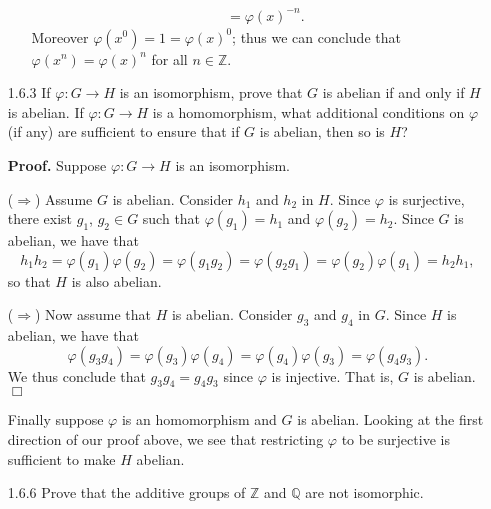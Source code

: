 \documentclass[9pt]{article}
\newcommand{\qed}{\hfill \ensuremath{\Box}}
\newcommand{\Z}{\mathbb{Z}}
\newcommand{\Q}{\mathbb{Q}}
\begin{document}
\begin{enumerate}
\begin{enumerate}
\begin{align*}
                     &= \varphi(x)^{-n}.
               \end{align*}
               Moreover $\varphi(x^0) = 1 = \varphi(x)^0$; thus we can conclude 
               that $\varphi(x^n) = \varphi(x)^n$ for all $n \in \Z$.
      \end{enumerate}
   \item[1.6.3]   If $\varphi : G \rightarrow H$ is an isomorphism, prove that
                  $G$ is abelian if and only if $H$ is abelian. If
                  $\varphi : G \rightarrow H$ is a homomorphism, what additional
                  conditions on $\varphi$ (if any) are sufficient to ensure that
                  if $G$ is abelian, then so is $H$?

      \textbf{Proof.} Suppose $\varphi : G \rightarrow H$ is an isomorphism.

      ($\Rightarrow$) Assume $G$ is abelian. Consider $h_1$ and $h_2$ in $H$.
      Since $\varphi$ is surjective, there exist $g_1$, $g_2 \in G$ such that
      $\varphi(g_1) = h_1$ and $\varphi(g_2) = h_2$. Since $G$ is abelian, we
      have that
      $$h_1h_2 = \varphi(g_1)\varphi(g_2) = \varphi(g_1g_2) = \varphi(g_2g_1) = 
        \varphi(g_2)\varphi(g_1) = h_2h_1,$$
      so that $H$ is also abelian.

      ($\Rightarrow$) Now assume that $H$ is abelian. Consider $g_3$ and $g_4$ 
      in $G$. Since $H$ is abelian, we have that
      $$\varphi(g_3g_4) = \varphi(g_3)\varphi(g_4) = \varphi(g_4)\varphi(g_3) =
        \varphi(g_4g_3).$$
      We thus conclude that $g_3g_4 = g_4g_3$ since $\varphi$ is injective. That
      is, $G$ is abelian. \qed

      Finally suppose $\varphi$ is an homomorphism and $G$ is abelian. Looking
      at the first direction of our proof above, we see that restricting
      $\varphi$ to be surjective is sufficient to make $H$ abelian.
   \item[1.6.6]   Prove that the additive groups of $\Z$ and $\Q$ are not
                  isomorphic.


\end{enumerate}
\end{document}
